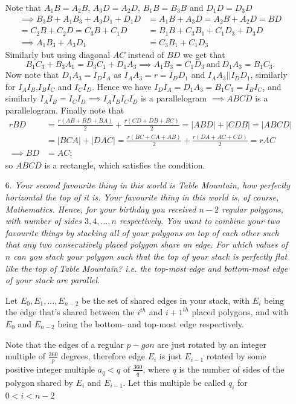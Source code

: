 \documentclass{article}
\begin{document}
\begin{enumerate}
Note that $A_1B = A_2B$, $A_3D = A_2D$, $B_1B = B_3B$ and $D_1D = D_3D$
\begin{align*}
	\implies B_3B+A_1B_3+A_3D_1+D_1D &= A_1B+A_3D = A_2B+A_2D = BD \\
	= C_2B+C_2D = C_3B+C_1D &= B_1B+C_3B_1+C_1D_3+D_3D \\
	\implies A_1B_3 + A_3D_1 &= C_3B_1+C_1D_3
\end{align*}
Similarly but using diagonal $AC$ instead of $BD$ we get that
\[ B_1C_3 + B_3A_1 = D_3C_1 + D_1A_3 \implies A_1B_3 = C_1D_3\ \text{and}\ D_1A_3 = B_1C_3. \]
Now note that $D_1A_3 = I_DI_A$ as $I_AA_3 = r = I_DD_1$ and $I_AA_3||I_DD_1$, similarly for $I_AI_B$,$I_BI_C$ and $I_CI_D$.
Hence we have $I_DI_A=D_1A_3=B_1C_3=I_BI_C$, and similarly $I_AI_B=I_CI_D \implies I_AI_BI_CI_D$ is a parallelogram $\implies ABCD$ is a parallelogram. 
Finally note that
\begin{align*}
	rBD &= \frac{r(AB+BD+BA)}{2} + \frac{r(CD+DB+BC)}{2} = |ABD|+|CDB| = |ABCD| \\
	&= |BCA|+|DAC| = \frac{r(BC+CA+AB)}{2} + \frac{r(DA+AC+CD)}{2} = rAC \\
	\implies BD &= AC;
\end{align*}
so $ABCD$ is a rectangle, which satisfies the condition.


\medskip
\item[6.] %
{\itshape Your second favourite thing in this world is Table Mountain, how perfectly horizontal the top of it is.
Your favourite thing in this world is, of course, Mathematics.
Hence, for your birthday you received $n-2$ regular polygons, with number of sides $3, 4, \dotsc, n$ respectively.
You want to combine your two favourite things by stacking all of your polygons on top of each other such that any two consecutively placed polygon share an edge.
For which values of $n$ can you stack your polygon such that the top of your stack is perfectly flat like the top of Table Mountain?
i.e. the top-most edge and bottom-most edge of your stack are parallel.}

Let $E_0,E_1,...,E_{n-2}$ be the set of shared edges in your stack, with $E_i$ being the edge that's shared between the $i^{th}$ and $i+1^{th}$ placed polygons, and with $E_0$ and $E_{n-2}$ being the bottom- and top-most edge respectively.

Note that the edges of a regular $p-gon$ are just rotated by an integer multiple of $\frac{360}{p}$ degrees, therefore edge $E_i$ is just $E_{i-1}$ rotated by some positive integer multiple $a_q < q$ of $\frac{360}{q}$, where $q$ is the number of sides of the polygon shared by $E_i$ and $E_{i-1}$.
Let this multiple be called $q_i$ for $0<i<n-2$


\end{enumerate}
\end{document}

